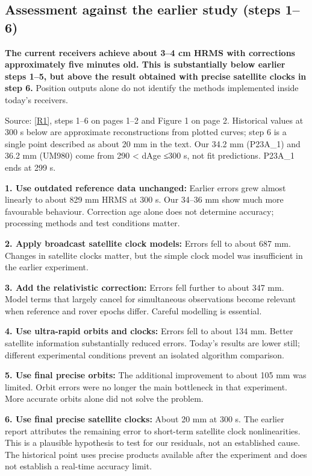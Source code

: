 \documentclass[11pt,a4paper]{article}
\numberwithin{equation}{section}
\numberwithin{figure}{section}
\begin{document}
\subsection{Assessment against the earlier study (steps 1–6)}

\textbf{The current receivers achieve about 3–4 cm HRMS with corrections approximately five minutes old. This is substantially below earlier steps 1–5, but above the result obtained with precise satellite clocks in step 6.} Position outputs alone do not identify the methods implemented inside today's receivers.

Source: \hyperlink{ref-R1}{[R1]}, steps 1–6 on pages 1–2 and Figure 1 on page 2. Historical values at 300 s below are approximate reconstructions from plotted curves; step 6 is a single point described as about 20 mm in the text. Our 34.2 mm (P23A\_1) and 36.2 mm (UM980) come from 290 < dAge ≤300 s, not fit predictions. P23A\_1 ends at 299 s.

\textbf{1. Use outdated reference data unchanged:} Earlier errors grew almost linearly to about 829 mm HRMS at 300 s. Our 34–36 mm show much more favourable behaviour. Correction age alone does not determine accuracy; processing methods and test conditions matter.

\textbf{2. Apply broadcast satellite clock models:} Errors fell to about 687 mm. Changes in satellite clocks matter, but the simple clock model was insufficient in the earlier experiment.

\textbf{3. Add the relativistic correction:} Errors fell further to about 347 mm. Model terms that largely cancel for simultaneous observations become relevant when reference and rover epochs differ. Careful modelling is essential.

\textbf{4. Use ultra-rapid orbits and clocks:} Errors fell to about 134 mm. Better satellite information substantially reduced errors. Today's results are lower still; different experimental conditions prevent an isolated algorithm comparison.

\textbf{5. Use final precise orbits:} The additional improvement to about 105 mm was limited. Orbit errors were no longer the main bottleneck in that experiment. More accurate orbits alone did not solve the problem.

\textbf{6. Use final precise satellite clocks:} About 20 mm at 300 s. The earlier report attributes the remaining error to short-term satellite clock nonlinearities. This is a plausible hypothesis to test for our residuals, not an established cause. The historical point uses precise products available after the experiment and does not establish a real-time accuracy limit.
\end{document}
